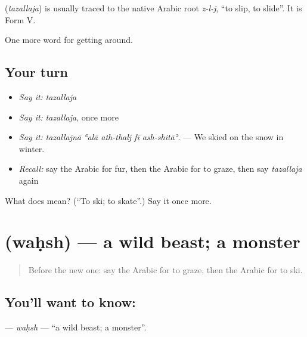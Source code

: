 \begin{cousinweb}
\textbf{} (\emph{tazallaja}) is usually traced to the native Arabic root \emph{z-l-j}, \textquotedblleft{}to slip, to slide\textquotedblright{}. It is Form V.
\end{cousinweb}

\begin{grammarlens}[title={What you've built}]
One more word for getting around.
\end{grammarlens}

\subsection*{Your turn}
\begin{itemize}
\raggedright
  \item \emph{Say it:} \emph{tazallaja}
  \item \emph{Say it:} \emph{tazallaja}, once more
  \item \emph{Say it:} \emph{tazallajnā ʿalā ath-thalj fī ash-shitāʾ.} — We skied on the snow in winter.
  \item \emph{Recall:} say the Arabic for fur, then the Arabic for to graze, then say \emph{tazallaja} again
\end{itemize}

\begin{tcolorbox}[breakable,colback=teal!4,colframe=teal!35!black,title={Before you move on}]
What does  mean? (\textquotedblleft{}To ski; to skate\textquotedblright{}.) Say it once more.
\end{tcolorbox}
\section[\texorpdfstring{\ar{وحش} (waḥsh)}{وحش (waḥsh)}]{ (waḥsh) — a wild beast; a monster}

\label{lesson:AR-C479-wahsh}



\begin{quote}
Before the new one: say the Arabic for to graze, then the Arabic for to ski.
\end{quote}

\subsection*{You'll want to know: }
\textbf{} — \emph{waḥsh} — \textquotedblleft{}a wild beast; a monster\textquotedblright{}.

